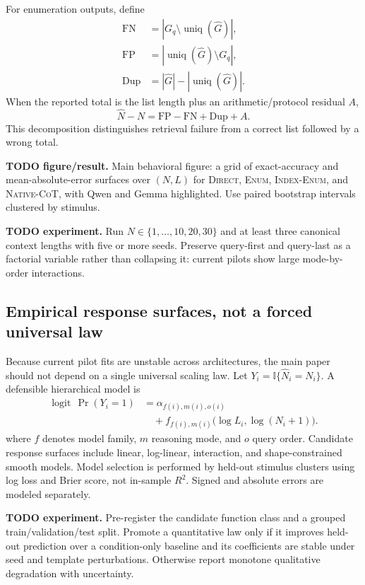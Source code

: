 \documentclass[10pt,twocolumn]{article}
\newcommand{\todoexp}[1]{%
  \par\noindent\textcolor{red!75!black}{\textbf{TODO experiment.} #1}\par}
\newcommand{\todoplot}[1]{%
  \par\noindent\textcolor{red!75!black}{\textbf{TODO figure/result.} #1}\par}
\newcommand{\direct}{\textsc{Direct}}
\newcommand{\enumplain}{\textsc{Enum}}
\newcommand{\enumindex}{\textsc{Index-Enum}}
\newcommand{\native}{\textsc{Native-CoT}}
\newcommand{\ind}{\mathbb{I}}
\newcommand{\logit}{\operatorname{logit}}
\begin{document}
For enumeration outputs, define
\[
\begin{aligned}
 \mathrm{FN} &= |G_q\setminus \operatorname{uniq}(\widehat G)|,\\
 \mathrm{FP} &= |\operatorname{uniq}(\widehat G)\setminus G_q|,\\
 \mathrm{Dup} &= |\widehat G|-|\operatorname{uniq}(\widehat G)|.
\end{aligned}
\]
When the reported total is the list length plus an arithmetic/protocol residual $A$,
\[
    \hat N-N = \mathrm{FP}-\mathrm{FN}+\mathrm{Dup}+A.
\]
This decomposition distinguishes retrieval failure from a correct list followed by a wrong total.

\todoplot{Main behavioral figure: a grid of exact-accuracy and mean-absolute-error surfaces over
$(N,L)$ for \direct, \enumplain, \enumindex, and \native, with Qwen and Gemma highlighted.
Use paired bootstrap intervals clustered by stimulus.}

\todoexp{Run $N\in\{1,\ldots,10,20,30\}$ and at least three canonical context lengths with
five or more seeds. Preserve query-first and query-last as a factorial variable rather than
collapsing it: current pilots show large mode-by-order interactions.}

\subsection{Empirical response surfaces, not a forced universal law}
Because current pilot fits are unstable across architectures, the main paper should not depend on
a single universal scaling law. Let $Y_i=\ind\{\hat N_i=N_i\}$. A defensible hierarchical model is
\[
\begin{aligned}
\logit\,\Pr(Y_i=1)
&=\alpha_{f(i),m(i),o(i)}\\
&\quad+f_{f(i),m(i)}
      \bigl(\log L_i,\log(N_i+1)\bigr).
\end{aligned}
\]
where $f$ denotes model family, $m$ reasoning mode, and $o$ query order. Candidate response
surfaces include linear, log-linear, interaction, and shape-constrained smooth models.
Model selection is performed by held-out stimulus clusters using log loss and Brier score, not
in-sample $R^2$. Signed and absolute errors are modeled separately.

\todoexp{Pre-register the candidate function class and a grouped train/validation/test split.
Promote a quantitative law only if it improves held-out prediction over a condition-only baseline
and its coefficients are stable under seed and template perturbations. Otherwise report monotone
qualitative degradation with uncertainty.}
\end{document}

